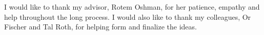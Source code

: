 I would like to thank my advisor, Rotem Oshman, for her patience, empathy and help throughout the long process. I would also like to thank my colleagues, Or Fischer and Tal Roth, for helping form and finalize the ideas.
